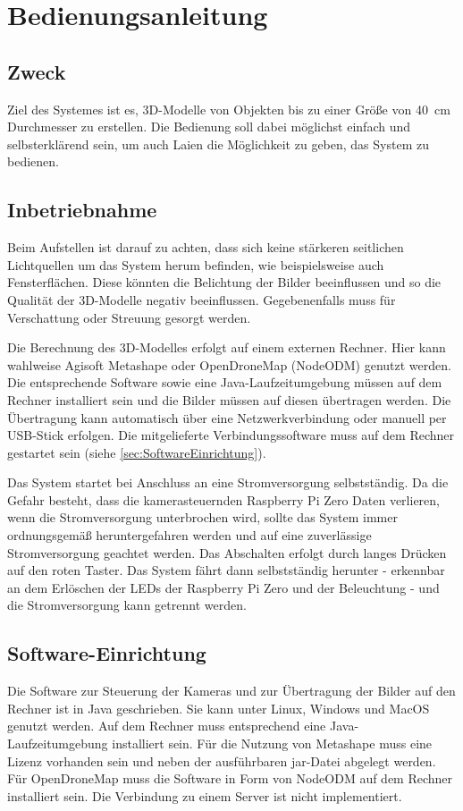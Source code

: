 \documentclass[./00PhotoBox.tex]{subfiles}
\begin{document}
\chapter{Bedienungsanleitung}

\section{Zweck}
Ziel des Systemes ist es, 3D-Modelle von Objekten bis zu einer Größe von 40~cm Durchmesser zu erstellen. Die Bedienung soll dabei möglichst einfach und selbsterklärend sein, um auch Laien die Möglichkeit zu geben, das System zu bedienen.

\section{Inbetriebnahme}
Beim Aufstellen ist darauf zu achten, dass sich keine stärkeren seitlichen Lichtquellen um das System herum befinden, wie beispielsweise auch Fensterflächen. Diese könnten die Belichtung der Bilder beeinflussen und so die Qualität der 3D-Modelle negativ beeinflussen. Gegebenenfalls muss für Verschattung oder Streuung gesorgt werden.

Die Berechnung des 3D-Modelles erfolgt auf einem externen Rechner. Hier kann wahlweise Agisoft Metashape oder OpenDroneMap (NodeODM) genutzt werden. Die entsprechende Software sowie eine Java-Laufzeitumgebung müssen auf dem Rechner installiert sein und die Bilder müssen auf diesen übertragen werden. Die Übertragung kann automatisch über eine Netzwerkverbindung oder manuell per USB-Stick erfolgen. Die mitgelieferte Verbindungssoftware muss auf dem Rechner gestartet sein (siehe \autoref{sec:SoftwareEinrichtung}).

Das System startet bei Anschluss an eine Stromversorgung selbstständig. Da die Gefahr besteht, dass die kamerasteuernden Raspberry Pi Zero Daten verlieren, wenn die Stromversorgung unterbrochen wird, sollte das System immer ordnungsgemäß heruntergefahren werden und auf eine zuverlässige Stromversorgung geachtet werden.
Das Abschalten erfolgt durch langes Drücken auf den roten Taster. Das System fährt dann selbstständig herunter - erkennbar an dem Erlöschen der LEDs der Raspberry Pi Zero und der Beleuchtung - und die Stromversorgung kann getrennt werden.

\section{Software-Einrichtung}
\label{sec:SoftwareEinrichtung}
Die Software zur Steuerung der Kameras und zur Übertragung der Bilder auf den Rechner ist in Java geschrieben. Sie kann unter Linux, Windows und MacOS genutzt werden. Auf dem Rechner muss entsprechend eine Java-Laufzeitumgebung installiert sein. Für die Nutzung von Metashape muss eine Lizenz vorhanden sein und neben der ausführbaren jar-Datei abgelegt werden. Für OpenDroneMap muss die Software in Form von NodeODM auf dem Rechner installiert sein. Die Verbindung zu einem Server ist nicht implementiert.
\end{document}
